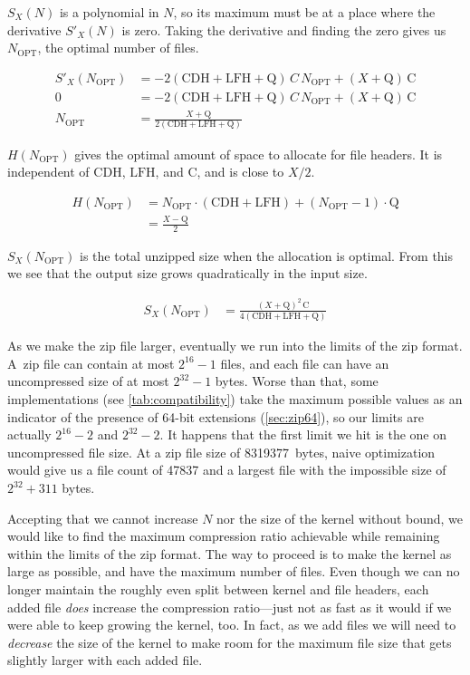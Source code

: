 \documentclass[letterpaper,twocolumn,10pt]{article}
\newcommand{\CDH}{\mathrm{CDH}}
\newcommand{\LFH}{\mathrm{LFH}}
\newcommand{\Q}{\mathrm{Q}}
\newcommand{\C}{\mathrm{C}}
\newcommand{\OPT}{\mathrm{OPT}}
\begin{document}
$S_X(N)$
is a polynomial in $N$,
so its maximum must be at a place where the derivative
$S'_X(N)$
is zero.
Taking the derivative and finding the zero gives us
$N_\OPT$,
the optimal number of files.

\begin{align*}
S'_X(N_\OPT) &= - 2 (\CDH + \LFH + \Q) \, C \, N_\OPT + (X + \Q) \, \C \\
           0 &= - 2 (\CDH + \LFH + \Q) \, C \, N_\OPT + (X + \Q) \, \C \\
     N_\OPT  &= \frac{X + \Q}{2 (\CDH + \LFH + \Q)}
\end{align*}

$H(N_\OPT)$
gives the optimal amount of space to allocate for file headers.
It is independent of $\CDH$, $\LFH$, and $\C$,
and is close to $X/2$.

\begin{align*}
H(N_\OPT) &= N_\OPT\cdot(\CDH + \LFH) + (N_\OPT - 1)\cdot\Q \\
          &= \frac{X - \Q}{2}
\end{align*}

$S_X(N_\OPT)$
is the total unzipped size
when the allocation is optimal.
From this we see that the output size grows quadratically
in the input size.

\begin{align}
\label{eq:opt}
S_X(N_\OPT) &= \frac{(X + \Q)^2 \, \C}{4(\CDH + \LFH + \Q)}
\end{align}

As we make the zip file larger,
eventually we run into the limits of the zip format.
A~zip file can contain at most $2^{16}-1$ files,
and each file can have an uncompressed size of at most $2^{32}-1$ bytes.
Worse than that,
some implementations (see \autoref{tab:compatibility})
take the maximum possible values
as an indicator of the presence of 64-bit extensions (\autoref{sec:zip64}),
so our limits are actually $2^{16}-2$ and $2^{32}-2$.
It happens that the first limit we hit is the one on uncompressed file size.
At a zip file size of \SI{8319377}{bytes},
naive optimization would give us a file count of \num{47837}
and a largest file with the impossible size of
$2^{32}+311$ bytes.
% 
% 

Accepting that we cannot increase $N$ nor the size of the kernel without bound,
we would like to find the maximum compression ratio achievable
while remaining within the limits of the zip format.
The way to proceed is to make the kernel as large as possible,
and have the maximum number of files.
Even though we can no longer maintain the roughly even split
between kernel and file headers,
each added file \emph{does} increase the compression ratio---just
not as fast as it would if we were able to keep growing the kernel, too.
In fact, as we add files we will need to \emph{decrease} the size of the kernel
to make room for the maximum file size
that gets slightly larger with each added file.
\end{document}
